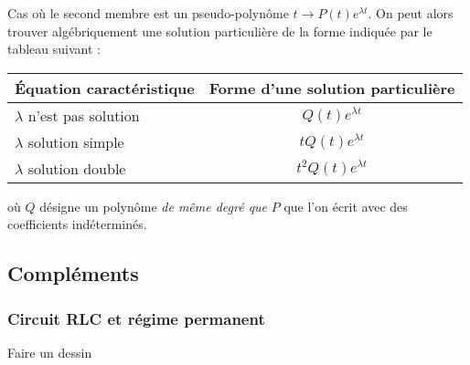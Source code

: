 Cas où le second membre est un pseudo-polynôme $t\rightarrow P(t)e^{\lambda t}$.\newline
On peut alors trouver algébriquement une solution particulière de la forme indiquée par le tableau suivant :
\begin{center}
\renewcommand{\arraystretch}{1.5}
\begin{tabular}{|l|c|} \hline
\'Equation caractéristique   & Forme d'une solution particulière \\ \hline
$\lambda$ n'est pas solution & $Q(t)e^{\lambda t}$               \\ \hline
$\lambda$ solution simple    & $tQ(t)e^{\lambda t}$              \\ \hline
$\lambda$ solution double    & $t^2Q(t)e^{\lambda t}$            \\ \hline
\end{tabular}
\end{center}
où $Q$ désigne un polynôme \emph{de même degré que } $P$ que l'on écrit avec des coefficients indéterminés.

\subsection{Compléments}
\subsubsection{Circuit RLC et régime permanent}
Faire un dessin

